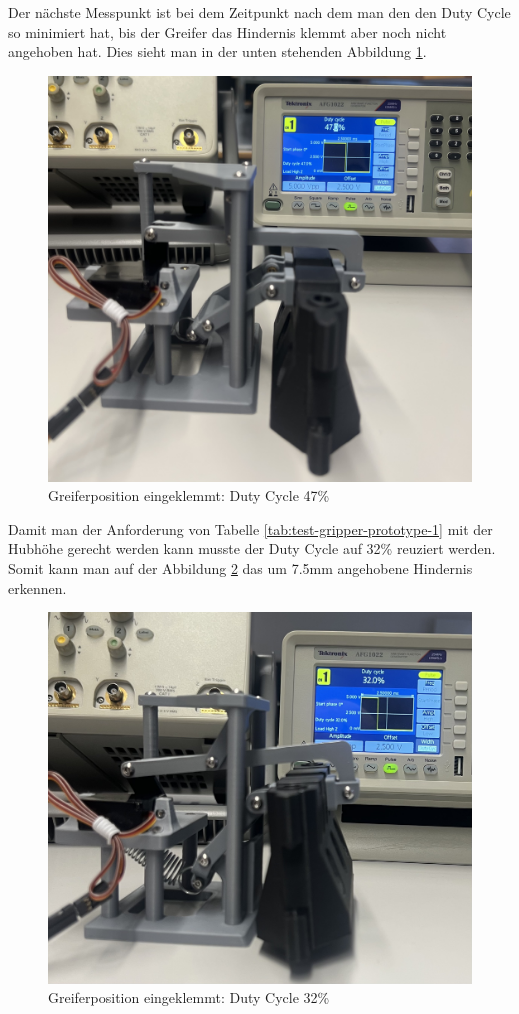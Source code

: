 \newpage

Der nächste Messpunkt ist bei dem Zeitpunkt nach dem man den den Duty Cycle so minimiert hat, bis der Greifer das Hindernis klemmt aber noch nicht angehoben hat. Dies sieht man in der unten stehenden Abbildung \ref{fig: Greiferposition eingeklemmt: Duty Cycle 47}.

\begin{figure}[H]
    \centering
    \includegraphics[width=0.8\linewidth]{img/ServoGreiferKlemmt.jpeg}
    \caption{Greiferposition eingeklemmt: Duty Cycle 47\%}
    \label{fig: Greiferposition eingeklemmt: Duty Cycle 47}
\end{figure}

\newpage

Damit man der Anforderung von Tabelle \ref{tab:test-gripper-prototype-1} mit der Hubhöhe gerecht werden kann musste der Duty Cycle auf 32\% reuziert werden. Somit kann man auf der Abbildung \ref{fig: Greiferposition angehoben: Duty Cycle 32} das um 7.5mm angehobene Hindernis erkennen.

\begin{figure}[H]
    \centering
    \includegraphics[width=0.8\linewidth]{img/ServoHindernisAngehoben.jpeg}
    \caption{Greiferposition eingeklemmt: Duty Cycle 32\%}
    \label{fig: Greiferposition angehoben: Duty Cycle 32}
\end{figure}